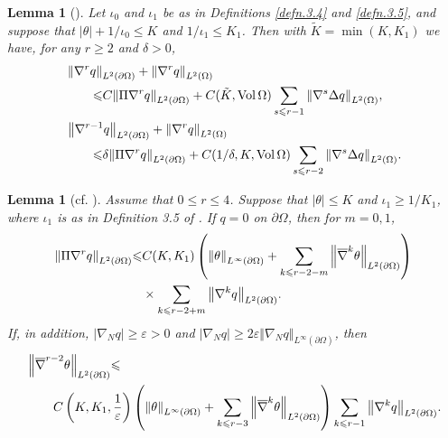 \documentclass[12pt,reqno]{amsart}
\numberwithin{equation}{section}
\newtheorem{lemma}[theorem]{Lemma}
\theoremstyle{definition}
\theoremstyle{remark}
\begin{document}
\begin{lemma}[\mbox{\cite[Proposition 5.8]{CL00}}] \label{lem.CL00prop5.8}
Let $\iota_0$ and $\iota_1$ be as in Definitions \ref{defn.3.4} and \ref{defn.3.5}, and suppose that $|\theta|+1/\iota_0{\leqslant} K$ and $1/\iota_1{\leqslant} K_1$. Then with $\tilde{K}=\min(K,K_1)$ we have, for any $r{\geqslant} 2$ and $\delta>0$,
\begin{align}
  &{\left\Vert{{\nabla}^r q}\right\Vert}_{L^2({\partial}\Omega)}+{\left\Vert{{\nabla}^r q}\right\Vert}_{L^2(\Omega)}{\nonumber}\\
  &\qquad{\leqslant} C{\left\Vert{\Pi {\nabla}^r q}\right\Vert}_{L^2({\partial}\Omega)}+C(\tilde{K},{\mathrm{Vol}\,}\Omega)\sum_{s{\leqslant} r-1} {\left\Vert{{\nabla}^s\Delta q}\right\Vert}_{L^2(\Omega)},\label{eq.CL00prop5.8.1}\\
  &{\left\Vert{{\nabla}^{r-1} q}\right\Vert}_{L^2({\partial}\Omega)}+{\left\Vert{{\nabla}^r q}\right\Vert}_{L^2(\Omega)}{\nonumber}\\
  &\qquad{\leqslant} \delta{\left\Vert{\Pi {\nabla}^r q}\right\Vert}_{L^2({\partial}\Omega)}+C(1/\delta,K,{\mathrm{Vol}\,}\Omega)\sum_{s{\leqslant} r-2} {\left\Vert{{\nabla}^s\Delta q}\right\Vert}_{L^2(\Omega)}.\label{eq.CL00prop5.8.2}
\end{align}
\end{lemma}

\begin{lemma}[cf. \mbox{\cite[Proposition 5.9]{CL00}}] \label{lem.CL00prop5.9}
  Assume that $0{\leqslant} r{\leqslant} 4$. Suppose that $|\theta|{\leqslant} K$ and $\iota_1{\geqslant} 1/K_1$, where $\iota_1$ is as in Definition 3.5 of \cite{CL00}. If $q=0$ on ${\partial}\Omega$, then for $m=0,1$,
  \begin{align}\label{eq.CL00prop5.9.1}
    {\left\Vert{\Pi{\nabla}^r q}\right\Vert}_{L^2({\partial}\Omega)}{\leqslant} & C(K,K_1)\left({\left\Vert{\theta}\right\Vert}_{L^\infty({\partial}\Omega)}+\sum_{k{\leqslant} r-2-m} {\left\Vert{{\overline{\nabla}}^k \theta}\right\Vert}_{L^2({\partial}\Omega)}\right){\nonumber} \\
    &\times\sum_{k{\leqslant} r-2+m}{\left\Vert{{\nabla}^k q}\right\Vert}_{L^2({\partial}\Omega)}.
  \end{align}
  If, in addition, $|{\nabla}_N q|{\geqslant} {\varepsilon}>0$ and $|{\nabla}_N q|{\geqslant} 2{\varepsilon} {\left\Vert{{\nabla}_N q}\right\Vert}_{L^\infty({\partial}\Omega)}$, then
  \begin{align}\label{eq.CL00prop5.9.2}
    &{\left\Vert{{\overline{\nabla}}^{r-2}\theta}\right\Vert}_{L^2({\partial}\Omega)} {\leqslant}\\
    &\qquad C\left(K,K_1,\frac{1}{\varepsilon}\right) \left({\left\Vert{\theta}\right\Vert}_{L^\infty({\partial}\Omega)}+\sum_{k{\leqslant} r-3} {\left\Vert{{\overline{\nabla}}^k \theta}\right\Vert}_{L^2({\partial}\Omega)}\right)\sum_{k{\leqslant} r-1} {\left\Vert{{\nabla}^k q}\right\Vert}_{L^2({\partial}\Omega)}.{\nonumber}
  \end{align}
\end{lemma}
\end{document}
